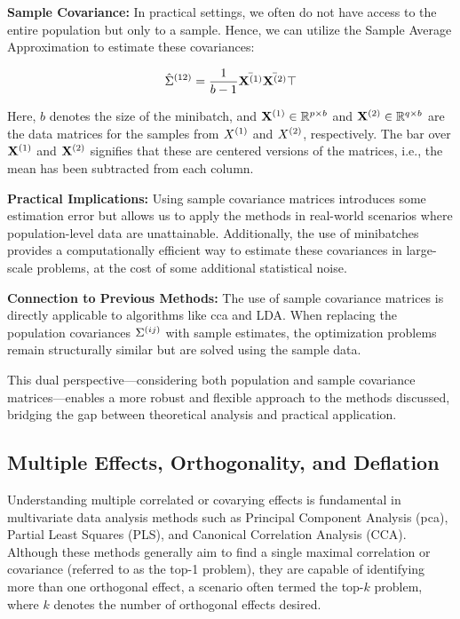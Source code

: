 \textbf{Sample Covariance:} In practical settings, we often do not have access to the entire population but only to a sample. Hence, we can utilize the Sample Average Approximation to estimate these covariances:

\[
    \hat{\Sigma}^{(12)} = \frac{1}{b-1} \bar{\mathbf{X}^{(1)}} \bar{\mathbf{X}^{(2)}}\top
\]

Here, \(b\) denotes the size of the minibatch, and \(\mathbf{X}^{(1)} \in \mathbb{R}^{p \times b}\) and \(\mathbf{X}^{(2)} \in \mathbb{R}^{q \times b}\) are the data matrices for the samples from \(X^{(1)}\) and \(X^{(2)}\), respectively. The bar over \(\mathbf{X}^{(1)}\) and \(\mathbf{X}^{(2)}\) signifies that these are centered versions of the matrices, i.e., the mean has been subtracted from each column.

\textbf{Practical Implications:} Using sample covariance matrices introduces some estimation error but allows us to apply the methods in real-world scenarios where population-level data are unattainable. Additionally, the use of minibatches provides a computationally efficient way to estimate these covariances in large-scale problems, at the cost of some additional statistical noise.

\textbf{Connection to Previous Methods:} The use of sample covariance matrices is directly applicable to algorithms like \acrshort{cca} and LDA. When replacing the population covariances \(\Sigma^{(ij)}\) with sample estimates, the optimization problems remain structurally similar but are solved using the sample data.

This dual perspective—considering both population and sample covariance matrices—enables a more robust and flexible approach to the methods discussed, bridging the gap between theoretical analysis and practical application.

\subsection{Multiple Effects, Orthogonality, and Deflation}\label{subsec:orthogonality}

Understanding multiple correlated or covarying effects is fundamental in multivariate data analysis methods such as Principal Component Analysis (\acrshort{pca}), Partial Least Squares (PLS), and Canonical Correlation Analysis (CCA). Although these methods generally aim to find a single maximal correlation or covariance (referred to as the top-1 problem), they are capable of identifying more than one orthogonal effect, a scenario often termed the top-$k$ problem, where $k$ denotes the number of orthogonal effects desired.

